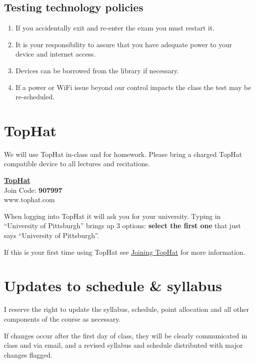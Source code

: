 \documentclass[
]{book}
\providecommand{\tightlist}{%
  \setlength{\itemsep}{0pt}\setlength{\parskip}{0pt}}
\begin{document}
\hypertarget{testing-technology-policies}{%
\section{Testing technology policies}\label{testing-technology-policies}}

\begin{enumerate}
\def\labelenumi{\arabic{enumi}.}
\tightlist
\item
  If you accidentally exit and re-enter the exam you must restart it.
\item
  It is your responsibility to assure that you have adequate power to your device and internet access.
\item
  Devices can be borrowed from the library if necessary.
\item
  If a power or WiFi issue beyond our control impacts the class the test may be re-scheduled.
\end{enumerate}

\hypertarget{tophat}{%
\chapter{TopHat}\label{tophat}}

We will use TopHat in-class and for homework. Please bring a charged TopHat compatible device to all lectures and recitations.

\href{www.tophat.com}{\textbf{TopHat}}\\
Join Code: \textbf{907997}\\
www.tophat.com

When logging into TopHat it will ask you for your university. Typing in ``University of Pittsburgh'' brings up 3 options: \textbf{select the first one} that just says ``University of Pittsburgh''.

If this is your first time using TopHat see \href{https://canvas.pitt.edu/courses/106737/pages/joining-tophat?module_item_id=2272350}{Joining TopHat} for more information.

\hypertarget{updates-to-schedule-syllabus}{%
\chapter{Updates to schedule \& syllabus}\label{updates-to-schedule-syllabus}}

I reserve the right to update the syllabus, schedule, point allocation and all other components of the course as necessary.

If changes occur after the first day of class, they will be clearly communicated in class and via email, and a revised syllabus and schedule distributed with major changes flagged.
\end{document}
